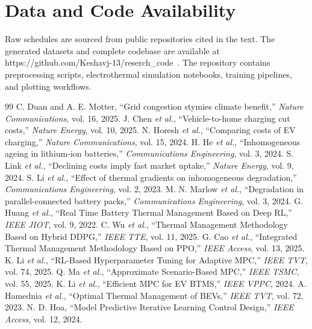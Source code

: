 \documentclass[twocolumn]{article}
\begin{document}
\section*{Data and Code Availability}

Raw schedules are sourced from public repositories cited in the text.
The generated datasets and complete codebase are available at https://github.com/Keshavj-13/reserch_code~\cite{KeshavRepo2026}.
The repository contains preprocessing scripts, electrothermal simulation notebooks, training pipelines, and plotting workflows.

\begin{thebibliography}{99}
 C. Duan and A. E. Motter, ``Grid congestion stymies climate benefit,'' \textit{Nature Communications}, vol. 16, 2025.
 J. Chen \textit{et al.}, ``Vehicle-to-home charging cut costs,'' \textit{Nature Energy}, vol. 10, 2025.
 N. Horesh \textit{et al.}, ``Comparing costs of EV charging,'' \textit{Nature Communications}, vol. 15, 2024.
 H. He \textit{et al.}, ``Inhomogeneous ageing in lithium-ion batteries,'' \textit{Communications Engineering}, vol. 3, 2024.
 S. Link \textit{et al.}, ``Declining costs imply fast market uptake,'' \textit{Nature Energy}, vol. 9, 2024.
 S. Li \textit{et al.}, ``Effect of thermal gradients on inhomogeneous degradation,'' \textit{Communications Engineering}, vol. 2, 2023.
 M. N. Marlow \textit{et al.}, ``Degradation in parallel-connected battery packs,'' \textit{Communications Engineering}, vol. 3, 2024.
 G. Huang \textit{et al.}, ``Real Time Battery Thermal Management Based on Deep RL,'' \textit{IEEE JIOT}, vol. 9, 2022.
 C. Wu \textit{et al.}, ``Thermal Management Methodology Based on Hybrid DDPG,'' \textit{IEEE TTE}, vol. 11, 2025.
 G. Cao \textit{et al.}, ``Integrated Thermal Management Methodology Based on PPO,'' \textit{IEEE Access}, vol. 13, 2025.
 K. Li \textit{et al.}, ``RL-Based Hyperparameter Tuning for Adaptive MPC,'' \textit{IEEE TVT}, vol. 74, 2025.
 Q. Ma \textit{et al.}, ``Approximate Scenario-Based MPC,'' \textit{IEEE TSMC}, vol. 55, 2025.
 K. Li \textit{et al.}, ``Efficient MPC for EV BTMS,'' \textit{IEEE VPPC}, 2024.
 A. Hamednia \textit{et al.}, ``Optimal Thermal Management of BEVs,'' \textit{IEEE TVT}, vol. 72, 2023.
 N. D. Hoa, ``Model Predictive Iterative Learning Control Design,'' \textit{IEEE Access}, vol. 12, 2024.

\end{thebibliography}
\end{document}
